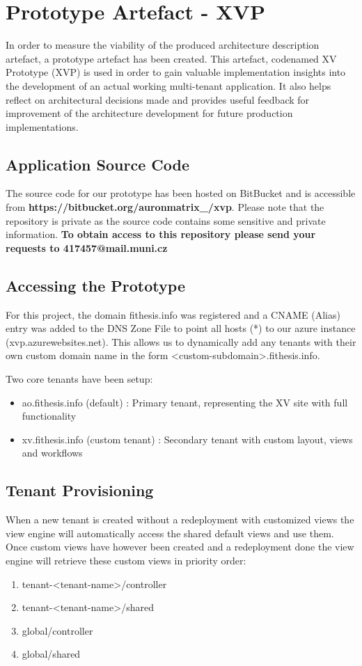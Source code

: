 \chapter{Prototype Artefact - XVP}

In order to measure the viability of the produced architecture description  artefact, a prototype artefact has been created. This artefact, codenamed XV Prototype (XVP) is used in order to gain valuable implementation insights into the development of an actual working multi-tenant  application. It also helps reflect on architectural decisions made and provides useful feedback for improvement of the architecture development for future production implementations.

\section{Application Source Code}

The source code for our prototype has been hosted on BitBucket and is accessible from \textbf{https://bitbucket.org/auronmatrix\_/xvp}. Please note that the repository is private as the source code contains some sensitive and private information. \textbf{To obtain access to this repository please send your requests to 417457@mail.muni.cz}

\section{Accessing the Prototype}
For this project, the domain fithesis.info was registered and a CNAME (Alias) entry was added to the DNS Zone File to point all hosts (*) to our azure instance (xvp.azurewebsites.net). This allows us to dynamically add any tenants with their own custom domain name in the form
<custom-subdomain>.fithesis.info. 

Two core tenants have been setup:
\begin{itemize}
\item ao.fithesis.info (default) : Primary tenant, representing the XV site with full functionality
\item xv.fithesis.info (custom tenant) : Secondary tenant with custom layout, views and workflows
\end{itemize}

\section{Tenant Provisioning}
When a new tenant is created without a redeployment with customized views the view engine will automatically access the shared default views and use them. Once custom views have however been created and a redeployment done the view engine will retrieve these custom views in priority order:
\begin{enumerate}
\item tenant-<tenant-name>/controller
\item tenant-<tenant-name>/shared
\item global/controller
\item global/shared
\end{enumerate}

